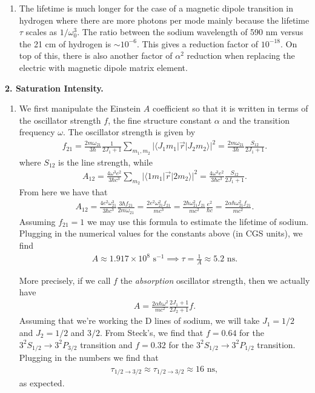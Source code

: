 \documentclass{article}
\theoremstyle{definition}
\newcommand{\al}{\alpha}
\newcommand{\f}[2]{\frac{#1}{#2}}
\begin{document}
\begin{enumerate}[label=(\alph*)]
\begin{enumerate}[label=(\roman*)]
	\end{enumerate}
	
	\item The lifetime is much longer for the case of a magnetic dipole transition in hydrogen where there are more photons per mode mainly because the lifetime $\tau$ scales as $1/\omega_0^3$. The ratio between the sodium wavelength of 590 nm versus the 21 cm of hydrogen is $\sim 10^{-6}$. This gives a reduction factor of $10^{-18}$. On top of this, there is also another factor of $\al^2$ reduction when replacing the electric with magnetic dipole matrix element. 

\end{enumerate}


\textbf{2. Saturation Intensity.}

\begin{enumerate}[label=(\alph*)]
	\item We first manipulate the Einstein $A$ coefficient so that it is written in terms of the oscillator strength $f$, the fine structure constant $\al$ and the transition frequency $\omega$. The oscillator strength is given by 
	\begin{align*}
	f_{21} = \f{2m\omega_{21}}{3\hbar} \f{1}{2J_1 + 1} \sum_{m_1,m_2} |\langle J_1 m_1 | \vec{r}| J_2 m_2 \rangle|^2 = \f{2m\omega_{21}}{3\hbar} \f{S_{12}}{2J_1+1}.
	\end{align*}
	where $S_{12}$ is the line strength, while 
	\begin{align*}
	A_{12} = \f{4\omega^3 e^2 }{3\hbar c^3} \sum_{m_2} |\langle 1 m_1| \vec{r} | 2 m_2 \rangle|^2 = \f{4\omega^3 e^2 }{3\hbar c^3} \f{S_{12}}{2J_1+1}.
	\end{align*}
	From here we have that
	\begin{align*}
	A_{12} = \f{4e^2 \omega_{21}^3}{3\hbar c^3} \f{3\hbar f_{21}}{2m\omega_{21}} = \f{2e^2 \omega_{21}^2f_{21}}{mc^3} =\f{2 \hbar \omega_{21}^2f_{21}}{mc^2} \f{e^2}{\hbar c} = \f{2\al \hbar \omega_{21}^2 f_{21}}{mc^2}.
	\end{align*}
	Assuming $f_{21} = 1$ we may use this formula to estimate the lifetime of sodium. Plugging in the numerical values for the constants above (in CGS units), we find 
	\begin{align*}
	A \approx 1.917 \times 10^8 \text{ s}^{-1} \implies \tau = \f{1}{A} \approx 5.2 \text{ ns}.
	\end{align*}
	
	
	More precisely, if we call $f$ the \textit{absorption} oscillator strength, then we actually have
	\begin{align*}
	A = \f{2\al \hbar \omega^2}{mc^2} \f{2J_1+1}{2J_2+1} f.
	\end{align*}
	Assuming that we're working the D lines of sodium, we will take $J_1 = 1/2$ and $J_2 = 1/2$ and $3/2$. From Steck's, we find that $f = 0.64$ for the $3^2S_{1/2} \to 3^2P_{3/2}$ transition and $f=0.32$ for the $3^2 S_{1/2} \to 3^2 P_{1/2}$ transition. Plugging in the numbers we find that
	\begin{align*}
	\tau_{1/2 \to 3/2} \approx \tau_{1/2\to 3/2} \approx 16 \text{ ns}, 
	\end{align*} 
	as expected.
	

\end{enumerate}
\end{document}

